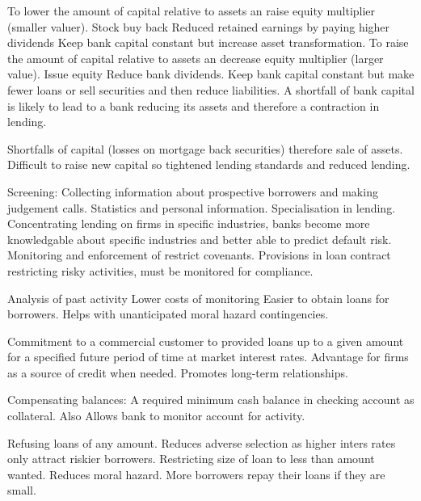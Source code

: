 \documentclass[12pt]{examnotes}
\begin{document}
\ra To lower the amount of capital relative to assets an raise equity multiplier (smaller valuer).
 Stock buy back
 Reduced retained earnings by paying higher dividends
 Keep bank capital constant but increase asset transformation.
\ra To raise the amount of capital relative to assets an decrease equity multiplier (larger value).
 Issue equity
 Reduce bank dividends.
 Keep bank capital constant but make fewer loans or sell securities and then reduce liabilities.
\ra A shortfall of bank capital is likely to lead to a bank reducing its assets and therefore a contraction in lending.

\ra Shortfalls of capital (losses on mortgage back securities) therefore sale of assets.
\ra Difficult to raise new capital so tightened lending standards and reduced lending.


 Screening: Collecting information about prospective borrowers and making judgement calls. Statistics and personal information.
 Specialisation in lending. Concentrating lending on firms in specific industries, banks become more knowledgable about specific industries and better able to predict default risk.
 Monitoring and enforcement of restrict covenants. Provisions in loan contract restricting risky activities, must be monitored for compliance.

\ra Analysis of past activity
\ra Lower costs of monitoring
\ra Easier to obtain loans for borrowers.
\ra Helps with unanticipated moral hazard contingencies.

\ra Commitment to a commercial customer to provided loans up to a given amount for a specified future period of time at market interest rates.
\ra Advantage for firms as a source of credit when needed.
\ra Promotes long-term relationships.

\ra Compensating balances: A required minimum cash balance in checking account as collateral. Also Allows bank to monitor account for activity.

\ra Refusing loans of any amount. Reduces adverse selection as higher inters rates only attract riskier borrowers.
\ra Restricting size of loan to less than amount wanted. Reduces moral hazard.  More borrowers repay their loans if they are small.
\end{document}
